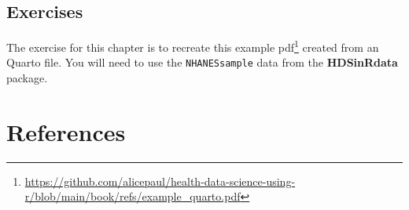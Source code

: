 \documentclass[
  letterpaper,
]{latex/krantz}
\renewcommand{\href}[2]{#2\footnote{\url{#1}}}
\begin{document}
\section{Exercises}\label{exercises-15}

The exercise for this chapter is to recreate
\href{https://github.com/alicepaul/health-data-science-using-r/blob/main/book/refs/example_quarto.pdf}{this
example pdf} created from an Quarto file. You will need to use the
\texttt{NHANESsample} data from the \textbf{HDSinRdata} package.


\chapter*{References}\label{references}

\end{document}
